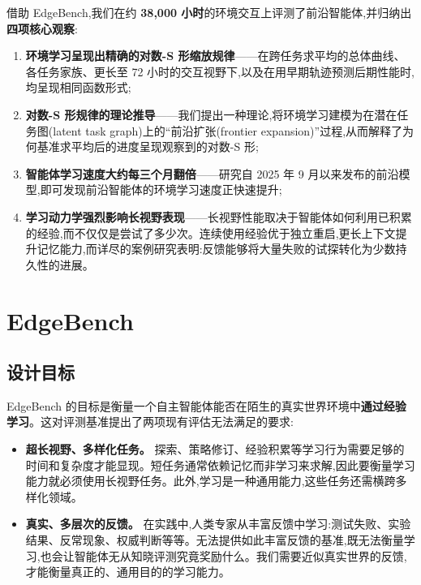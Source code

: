 借助 EdgeBench,我们在约 \textbf{38{,}000 小时}的环境交互上评测了前沿智能体,并归纳出\textbf{四项核心观察}:

\begin{enumerate}
    \item \textbf{环境学习呈现出精确的对数-S 形缩放规律}——在跨任务求平均的总体曲线、各任务家族、更长至 72 小时的交互视野下,以及在用早期轨迹预测后期性能时,均呈现相同函数形式;
    \item \textbf{对数-S 形规律的理论推导}——我们提出一种理论,将环境学习建模为在潜在任务图(latent task graph)上的``前沿扩张(frontier expansion)''过程,从而解释了为何基准求平均后的进度呈现观察到的对数-S 形;
    \item \textbf{智能体学习速度大约每三个月翻倍}——研究自 2025 年 9 月以来发布的前沿模型,即可发现前沿智能体的环境学习速度正快速提升;
    \item \textbf{学习动力学强烈影响长视野表现}——长视野性能取决于智能体如何利用已积累的经验,而不仅仅是尝试了多少次。连续使用经验优于独立重启,更长上下文提升记忆能力,而详尽的案例研究表明:反馈能够将大量失败的试探转化为少数持久性的进展。
\end{enumerate}

\section{EdgeBench}
\label{sec:bench}

\subsection{设计目标}
\label{sec:design}

EdgeBench 的目标是衡量一个自主智能体能否在陌生的真实世界环境中\textbf{通过经验学习}。这对评测基准提出了两项现有评估无法满足的要求:

\begin{itemize}
    \item \textbf{超长视野、多样化任务。} 探索、策略修订、经验积累等学习行为需要足够的时间和复杂度才能显现。短任务通常依赖记忆而非学习来求解,因此要衡量学习能力就必须使用长视野任务。此外,学习是一种通用能力,这些任务还需横跨多样化领域。
    \item \textbf{真实、多层次的反馈。} 在实践中,人类专家从丰富反馈中学习:测试失败、实验结果、反常现象、权威判断等等。无法提供如此丰富反馈的基准,既无法衡量学习,也会让智能体无从知晓评测究竟奖励什么。我们需要近似真实世界的反馈,才能衡量真正的、通用目的的学习能力。
\end{itemize}

